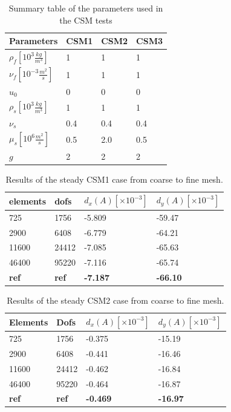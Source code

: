 \begin{table}[H]
\centering
\caption{Summary table of the parameters used in the CSM tests}
\label{my-label}
\begin{tabular}{|l|l|l|l|}
\hline
Parameters & CSM1 & CSM2 & CSM3 \\ \hline
$\rho_f[10^3 \frac{kg}{m^3}]$ & 1 & 1 & 1 \\ \hline
$\nu_f [10^{-3} \frac{m^2}{s}]$ & 1 & 1 & 1 \\ \hline
$u_0$ & 0 & 0 & 0 \\ \hline
$\rho_s[10^3 \frac{kg}{m^3}]$ & 1 & 1 & 1 \\ \hline
$\nu_s$ & 0.4 & 0.4 & 0.4 \\ \hline
$\mu_s[10^6 \frac{m^2}{s}]$ & 0.5 & 2.0 & 0.5 \\ \hline
$g $ & 2 & 2 & 2 \\ \hline
\end{tabular}
\end{table}

\begin{table}[H]
\centering
\caption{Results of the steady CSM1 case from coarse to fine mesh.}
\label{tab:CSM1}
\begin{tabular}{|l|l|l|l|}
\hline
elements & dofs & $d_x(A) [\times10^{-3}]$ & $d_y(A) [\times10^{-3}]$ \\ \hline
725 & 1756 & -5.809 & -59.47 \\ \hline
2900 & 6408 & -6.779 & -64.21 \\ \hline
11600 & 24412 & -7.085 & -65.63 \\ \hline
46400 & 95220 & -7.116 & -65.74 \\ \hline
\textbf{ref} & \textbf{ref} & \textbf{-7.187} &  \textbf{-66.10} \\ \hline
\end{tabular}
\end{table}

\begin{table}[H]
\centering
\caption{Results of the steady CSM2 case from coarse to fine mesh.}
\label{tab:CSM2}
\begin{tabular}{@{}|l|l|l|l|@{}}
\hline
Elements & Dofs & $d_x(A) [\times10^{-3}] $& $d_y(A) [\times10^{-3}] $\\ \hline
725 &  1756 & -0.375 & -15.19 \\ \hline
2900 & 6408 & -0.441 & -16.46\\ \hline
11600 & 24412 & -0.462 & -16.84 \\ \hline
46400 & 95220 & -0.464 & -16.87\\ \hline
\textbf{ref} & \textbf{ref} &  \textbf{-0.469} &  \textbf{-16.97} \\ \hline
\end{tabular}
\end{table}


